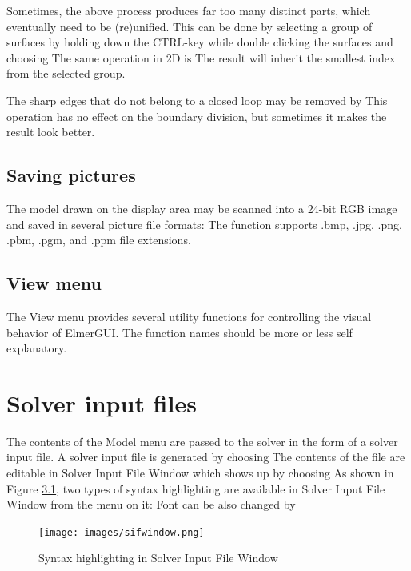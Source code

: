 Sometimes, the above process produces far too many distinct parts, which eventually
need to be (re)unified. This can be done by selecting a group of surfaces by holding
down the CTRL-key while double clicking the surfaces and choosing
\noindent The same operation in 2D is
The result will inherit the smallest index from the selected group.

\noindent The sharp edges that do not belong to a closed loop may be removed by
\noindent This operation has no effect on the boundary division, but sometimes it makes
the result look better.

\section{Saving pictures}

The model drawn on the display area may be scanned into a 24-bit RGB image and saved in
several picture file formats:
\noindent The function supports .bmp, .jpg, .png, .pbm, .pgm, and .ppm file extensions.

\section{View menu}

The View menu provides several utility functions for controlling the visual behavior
of ElmerGUI. The function names should be more or less self explanatory.

\chapter{Solver input files}

The contents of the Model menu are passed to the solver in the form of a solver
input file. A solver input file is generated by choosing
\noindent The contents of the file are editable in Solver Input File Window which shows up by choosing
As shown in Figure  \ref{fig:sifwindow}, two types of syntax highlighting are available in Solver Input File Window from the menu on it:
\noindent Font can be also changed by 

\begin{figure}[htb]
	\begin{center}
		\texttt{[image: images/sifwindow.png]}
		\caption{Syntax highlighting in Solver Input File Window}
		\label{fig:sifwindow}
	\end{center}
\end{figure}


